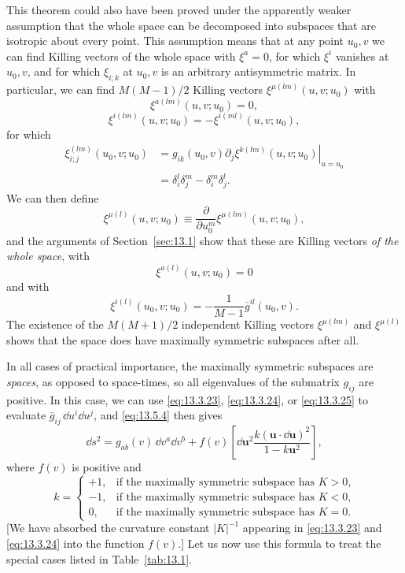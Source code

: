 This theorem could also have been proved under the apparently weaker
assumption that the whole space can be decomposed into subspaces that are
isotropic about every point. This assumption means that at any point
\(u_0,v\) we can find Killing vectors of the whole space with \(\xi^a=0\),
for which \(\xi^i\) vanishes at \(u_0,v\), and for which \(\xi_{i;k}\) at
\(u_0,v\) is an arbitrary antisymmetric matrix. In particular, we can find
\(M(M-1)/2\) Killing vectors \(\xi^{\mu(lm)}(u,v;u_0)\) with
\[
  \xi^{a(lm)}(u,v;u_0)=0,
\]
\[
  \xi^{i(lm)}(u,v;u_0)
  =
  -\xi^{i(ml)}(u,v;u_0),
\]
for which
\[
  \begin{aligned}
  \xi_{i;j}^{(lm)}(u_0,v;u_0)
  &=
  g_{ik}(u_0,v)
  \left.
    \partial_j\xi^{k(lm)}(u,v;u_0)
  \right|_{u=u_0}
  \\
  &=
  \delta_i^l\delta_j^m-\delta_i^m\delta_j^l.
  \end{aligned}
\]
We can then define
\[
  \xi^{\mu(l)}(u,v;u_0)
  \equiv
  \frac{\partial}{\partial u_0^m}
  \xi^{\mu(lm)}(u,v;u_0),
\]
and the arguments of Section~\ref{sec:13.1} show that these are Killing
vectors \emph{of the whole space}, with
\[
  \xi^{a(l)}(u,v;u_0)=0
\]
and with
\[
  \xi^{i(l)}(u_0,v;u_0)
  =
  -\frac1{M-1}\bar g^{il}(u_0,v).
\]
The existence of the \(M(M+1)/2\) independent Killing vectors
\(\xi^{\mu(lm)}\) and \(\xi^{\mu(l)}\) shows that the space does have
maximally symmetric subspaces after all.

In all cases of practical importance, the maximally symmetric subspaces are
\emph{spaces}, as opposed to space-times, so all eigenvalues of the
submatrix \(g_{ij}\) are positive. In this case, we can use
\eqref{eq:13.3.23}, \eqref{eq:13.3.24}, or \eqref{eq:13.3.25} to
evaluate \(\bar g_{ij}\,\dd u^i\dd u^j\), and \eqref{eq:13.5.4} then gives
\begin{equation}
  \dd s^2
  =
  g_{ab}(v)\,\dd v^a\dd v^b
  +f(v)
  \left[
    \dd\mathbf{u}^2
    \frac{k(\mathbf{u}\cdot\dd\mathbf{u})^2}
         {1-k\mathbf{u}^2}
  \right],
  \tag{13.5.27}\label{eq:13.5.27}
\end{equation}
where \(f(v)\) is positive and
\begin{equation}
  k=
  \begin{cases}
    +1, & \text{if the maximally symmetric subspace has \(K>0\),}\\
    -1, & \text{if the maximally symmetric subspace has \(K<0\),}\\
    0,  & \text{if the maximally symmetric subspace has \(K=0\).}
  \end{cases}
  \tag{13.5.28}\label{eq:13.5.28}
\end{equation}
[We have absorbed the curvature constant \(\lvert K\rvert^{-1}\) appearing
in \eqref{eq:13.3.23} and \eqref{eq:13.3.24} into the function \(f(v)\).]
Let us now use this formula to treat the special cases listed in
Table~\ref{tab:13.1}.

